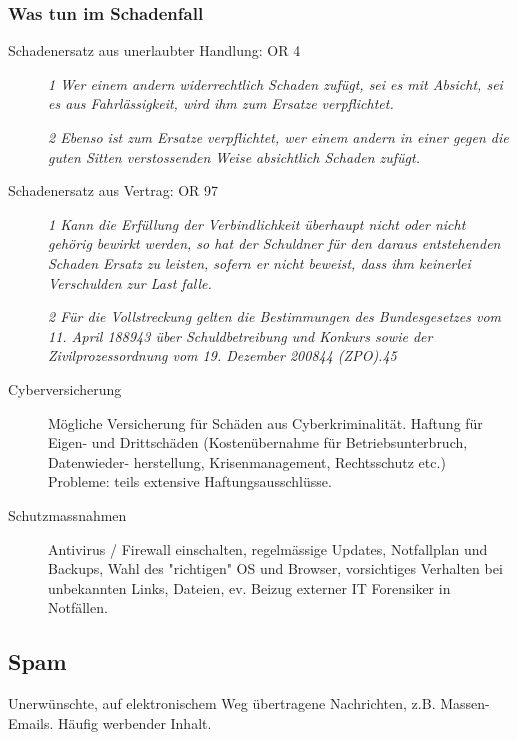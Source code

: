 \subsubsection{Was tun im Schadenfall}
\begin{description}
  \item[Schadenersatz aus unerlaubter Handlung: OR 4]

  \textit{1 Wer einem andern widerrechtlich Schaden zufügt, sei es mit Absicht, sei es aus Fahrlässigkeit, wird ihm zum Ersatze verpflichtet.}
  
  \textit{2 Ebenso ist zum Ersatze verpflichtet, wer einem andern in einer gegen die guten Sitten verstossenden Weise absichtlich Schaden zufügt.}
  \vspace{3mm}
  
  \item[Schadenersatz aus Vertrag: OR 97]

  \textit{1 Kann die Erfüllung der Verbindlichkeit überhaupt nicht oder nicht gehörig bewirkt werden, so hat der Schuldner für den daraus entstehenden Schaden Ersatz zu leisten, sofern er nicht beweist, dass ihm keinerlei Verschulden zur Last falle.}

  \textit{2 Für die Vollstreckung gelten die Bestimmungen des Bundesgesetzes vom 11. April 188943 über Schuldbetreibung und Konkurs sowie der Zivilprozessordnung vom 19. Dezember 200844 (ZPO).45}
  \item[Cyberversicherung] Mögliche Versicherung für Schäden aus Cyberkriminalität. Haftung für Eigen- und Drittschäden (Kostenübernahme für Betriebsunterbruch, Datenwieder-
herstellung, Krisenmanagement, Rechtsschutz etc.) Probleme: teils extensive Haftungsausschlüsse.
  \item[Schutzmassnahmen] Antivirus / Firewall einschalten, regelmässige Updates, Notfallplan und Backups, Wahl des "richtigen" OS und Browser, vorsichtiges Verhalten bei unbekannten Links, Dateien, ev. Beizug externer IT Forensiker in Notfällen.
\end{description}

\subsection{Spam}
Unerwünschte, auf elektronischem Weg übertragene Nachrichten, z.B. Massen-Emails. Häufig werbender Inhalt.

